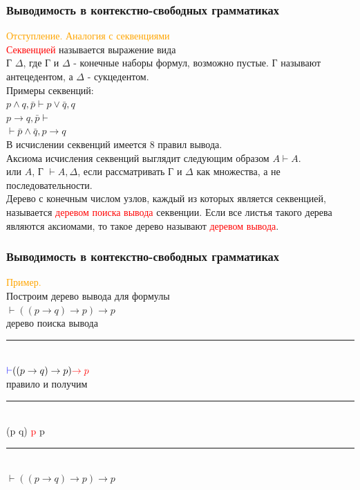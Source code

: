 \documentclass{beamer}
\begin{document}
		\begin{frame}
    \frametitle{Выводимость в контекстно-свободных грамматиках}
    \textcolor{orange}{Отступление. Аналогия с секвенциями}\\
    \textcolor{red}{Секвенцией} называется выражение вида\\
    Г \vdash  $\Delta$, где Г и $\Delta$ - конечные наборы формул, возможно пустые.
    Г называют антецедентом, а $\Delta$ - сукцедентом.\\
    Примеры секвенций:\\
    $p \land q, \bar p \vdash p \lor \bar q, q$\\
    $p \rightarrow q, \bar p \vdash$\\
    $\vdash \bar p \land \bar q, p \rightarrow q$\\
    В исчислении секвенций имеется 8 правил вывода.\\
    Аксиома исчисления секвенций выглядит следующим образом $A \vdash A$.
    \\или $A$, Г $\vdash A, \Delta$, если рассматривать Г и $\Delta$ как множества, а не последовательности.\\
    Дерево с конечным числом узлов, каждый из которых является секвенцией, называется \textcolor{red}{деревом поиска вывода} секвенции. Если все листья такого дерева являются аксиомами, то такое дерево называют \textcolor{red}{деревом вывода}.
    
	\end{frame}
	
	\begin{frame}
    \frametitle{Выводимость в контекстно-свободных грамматиках}
         \textcolor{orange}{Пример.}\\
         Построим дерево вывода для формулы\\
         $\vdash ((p \rightarrow q) \rightarrow p) \rightarrow p$
          \\ дерево поиска вывода
          \\\noindent\rule{4cm}{0.4pt}
          \\\hspace{3mm}$\textcolor{blue}{\vdash} ((p \rightarrow q) \rightarrow p) \textcolor{red}{\rightarrow p}$
          \\ правило и получим\\
          \noindent\rule{3cm}{0.4pt}\\
          \hspace{3mm} (p \rightarrow q) \textcolor{red}{\rightarrow p}  \textcolor{blue}{\vdash} p\\
          \noindent\rule{4cm}{0.4pt}
          \\\hspace{3mm}$\vdash ((p \rightarrow q) \rightarrow p) \rightarrow p$
	\end{frame}
	
\end{document}

